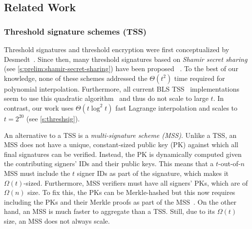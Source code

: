 \subsection{Related Work}
\label{s:related-work}


\subsubsection{Threshold signature schemes (TSS)}
\label{s:related-work:tss}
Threshold signatures and threshold encryption were first conceptualized by Desmedt~\cite{Desmedt1987Society}.
Since then, many threshold signatures based on \textit{Shamir secret sharing} (see \cref{s:prelim:shamir-secret-sharing}) have been proposed ~\cite{DesmedtFrankel1992SharedGeneration,Shoup2000Practical,Harn1994GroupOriented,Park96NewElGamal,Gennaro1996Robust,threshold-schnorr,Boldyreva2003Threshold,GennaroGoldfederNarayanan2016ThresholdOptimal}.
To the best of our knowledge, none of these schemes addressed the $\Theta(t^2)$ time required for polynomial interpolation.
Furthermore, all current BLS TSS~\cite{Boldyreva2003Threshold} implementations seem to use this quadratic algorithm~\cite{bls-chia-impl,sbft,bls-dfinity-impl,bls-herumi-impl} and thus do not scale to large $t$.
In contrast, our work uses $\Theta(t\log^2{t})$ fast Lagrange interpolation and scales to $t = 2^{20}$ (see \cref{s:threshsig}).

An alternative to a TSS is a \textit{multi-signature scheme (MSS)}.
Unlike a TSS, an MSS does not have a unique, constant-sized public key (PK) against which all final signatures can be verified.
Instead, the PK is dynamically computed given the contributing signers' IDs and their public keys.
This means that a $t$-out-of-$n$ MSS must include the $t$ signer IDs as part of the signature, which makes it $\Omega(t)$-sized.
Furthermore, MSS verifiers must have all signers' PKs, which are of $\Omega(n)$ size.
To fix this, the PKs can be Merkle-hashed but this now requires including the PKs and their Merkle proofs as part of the MSS~\cite{cosi}.
On the other hand, an MSS is much faster to aggregate than a TSS.
Still, due to its $\Omega(t)$ size, an MSS does not always scale.

